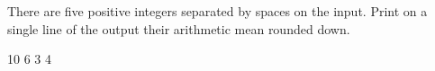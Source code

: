 




There are five positive integers separated by spaces on the input. Print on a single line of the output their arithmetic mean rounded down.

 10 6 3 4
\koniec

